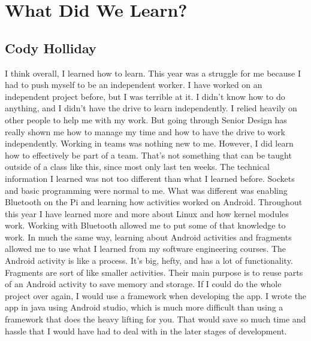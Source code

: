 \section{What Did We Learn?}
\subsection{Cody Holliday}
I think overall, I learned how to learn. This year was a struggle for me because I had to push myself to be an independent worker.
I have worked on an independent project before, but I was terrible at it.
I didn't know how to do anything, and I didn't have the drive to learn independently. 
I relied heavily on other people to help me with my work.
But going through Senior Design has really shown me how to manage my time and how to have the drive to work independently.
Working in teams was nothing new to me. However, I did learn how to effectively be part of a team.
That's not something that can be taught outside of a class like this, since most only last ten weeks.
The technical information I learned was not too different than what I learned before.
Sockets and basic programming were normal to me. What was different was enabling Bluetooth on the Pi and learning how activities worked on Android.
Throughout this year I have learned more and more about Linux and how kernel modules work.
Working with Bluetooth allowed me to put some of that knowledge to work.
In much the same way, learning about Android activities and fragments allowed me to use what I learned from my software engineering courses.
The Android activity is like a process. It's big, hefty, and has a lot of functionality.
Fragments are sort of like smaller activities. Their main purpose is to reuse parts of an Android activity to save memory and storage.
If I could do the whole project over again, I would use a framework when developing the app.
I wrote the app in java using Android studio, which is much more difficult than using a framework that does the heavy lifting for you.
That would save so much time and hassle that I would have had to deal with in the later stages of development.


